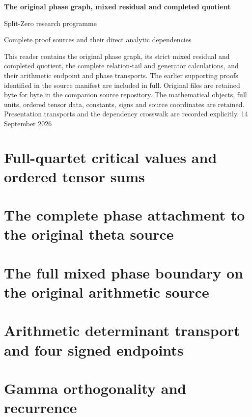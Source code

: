 \documentclass[11pt,a4paper,oneside,openany]{book}
\theoremstyle{definition}
\begin{document}
\begin{titlepage}
\vspace*{18mm}
{\Huge\bfseries The original phase graph, mixed residual and completed quotient\par}
\vspace{12mm}
{\Large Split-Zero research programme\par}
\vspace{8mm}
{\large Complete proof sources and their direct analytic dependencies\par}
\vfill
This reader contains the original phase graph, its strict mixed residual and completed quotient, the complete relation-tail and generator calculations, and their arithmetic endpoint and phase transports. The earlier supporting proofs identified in the source manifest are included in full. Original files are retained byte for byte in the companion source repository. The mathematical objects, full units, ordered tensor data, constants, signs and source coordinates are retained. Presentation transports and the dependency crosswalk are recorded explicitly.
\vspace{8mm}
14 September 2026
\end{titlepage}
\tableofcontents
\chapter{Full-quartet critical values and ordered tensor sums}
\begingroup

\endgroup
\chapter{The complete phase attachment to the original theta source}
\begingroup

\endgroup
\chapter{The full mixed phase boundary on the original arithmetic source}
\begingroup

\endgroup
\chapter{Arithmetic determinant transport and four signed endpoints}
\begingroup

\endgroup
\chapter{Gamma orthogonality and recurrence}
\begingroup

\endgroup
\end{document}
